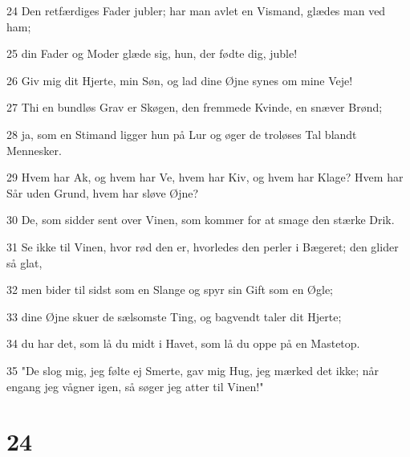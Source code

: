 \par 24 Den retfærdiges Fader jubler; har man avlet en Vismand, glædes man ved ham;
\par 25 din Fader og Moder glæde sig, hun, der fødte dig, juble!
\par 26 Giv mig dit Hjerte, min Søn, og lad dine Øjne synes om mine Veje!
\par 27 Thi en bundløs Grav er Skøgen, den fremmede Kvinde, en snæver Brønd;
\par 28 ja, som en Stimand ligger hun på Lur og øger de troløses Tal blandt Mennesker.
\par 29 Hvem har Ak, og hvem har Ve, hvem har Kiv, og hvem har Klage? Hvem har Sår uden Grund, hvem har sløve Øjne?
\par 30 De, som sidder sent over Vinen, som kommer for at smage den stærke Drik.
\par 31 Se ikke til Vinen, hvor rød den er, hvorledes den perler i Bægeret; den glider så glat,
\par 32 men bider til sidst som en Slange og spyr sin Gift som en Øgle;
\par 33 dine Øjne skuer de sælsomste Ting, og bagvendt taler dit Hjerte;
\par 34 du har det, som lå du midt i Havet, som lå du oppe på en Mastetop.
\par 35 "De slog mig, jeg følte ej Smerte, gav mig Hug, jeg mærked det ikke; når engang jeg vågner igen, så søger jeg atter til Vinen!"

\chapter{24}

